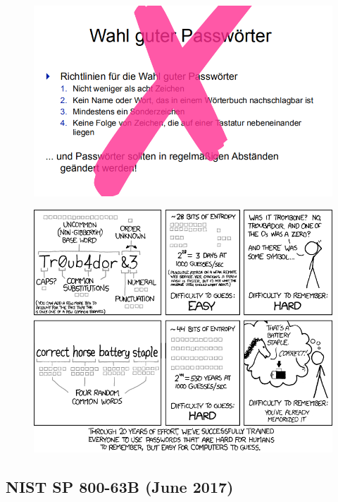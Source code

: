 \documentclass[openany]{book}
\begin{document}
\begin{figure}[h!]
    \centering
    \includegraphics[width=\linewidth]{Pics/Passwords.PNG}
\end{figure}

\begin{figure}[h!]
    \centering
    \includegraphics[width=\linewidth]{Pics/Passwords2.PNG}
\end{figure}

\newpage

\subsection{NIST SP 800-63B (June 2017)}
\end{document}

